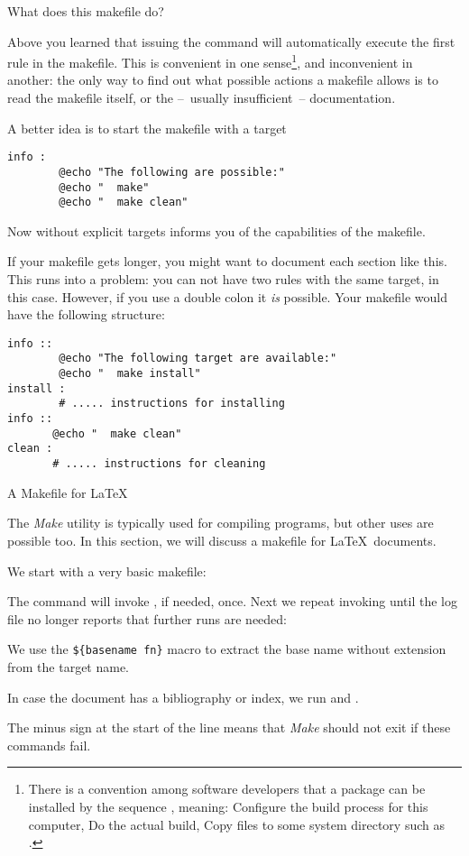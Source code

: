  {What does this makefile do?}

Above you learned that issuing the  command will automatically
execute the first rule in the makefile. This is convenient in one
sense\footnote {There is a convention among software developers that a
  package can be installed by the sequence , meaning: Configure the build process for this
  computer, Do the actual build, Copy files to some system directory
  such as .}, and inconvenient in another: the only way to
find out what possible actions a makefile allows is to read the
makefile itself, or the --~usually insufficient~-- documentation.

A better idea is to start the makefile with a target
\begin{verbatim}
info :
        @echo "The following are possible:"
        @echo "  make"
        @echo "  make clean"
\end{verbatim}
Now  without explicit targets informs you of the capabilities
of the makefile.

If your makefile gets longer, you might want to document each section
like this. This runs into a problem: you can not have two rules with the same
target,  in this case. However, if you use a double colon
it \emph{is} possible. Your makefile would have the following structure:
\begin{verbatim}
info ::
        @echo "The following target are available:"
        @echo "  make install"
install :
        # ..... instructions for installing
info ::
       @echo "  make clean"
clean :
       # ..... instructions for cleaning
\end{verbatim}

 {A Makefile for \LaTeX}
\label{sec:latex-make}

The \emph{Make} utility is typically used for compiling programs, but
other uses are possible too. In this section, we will discuss a
makefile for \LaTeX\ documents.

We start with a very basic makefile:

The command  will invoke ,
if needed, once. Next we repeat invoking  until the log file no
longer reports that further runs are needed:

We use the \verb+${basename fn}+ macro to extract the base name
without extension from the target name.

In case the document has a bibliography or index, we run 
and . 

The minus sign at the start of the line means that
\emph{Make} should not exit if these commands fail.

